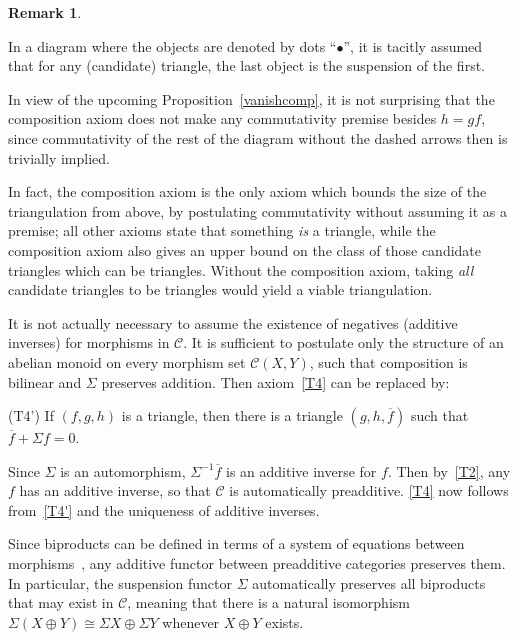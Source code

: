 \documentclass{amsproc}
\theoremstyle{definition}
\newtheorem{rem}[prop]{Remark}
\begin{document}
\begin{rem}
\label{defrems}
\begin{compactenum}
\item In a diagram where the objects are denoted by dots ``${\bullet}$'', it is tacitly assumed that for any (candidate) triangle, the last object is the suspension of the first.
\item In view of the upcoming Proposition~\ref{vanishcomp}, it is not surprising that the composition axiom does not make any commutativity premise besides $h=gf$, since commutativity of the rest of the diagram without the dashed arrows then is trivially implied.
\item In fact, the composition axiom is the only axiom which bounds the size of the triangulation from above, by postulating commutativity without assuming it as a premise; all other axioms state that something \emph{is} a triangle, while the composition axiom also gives an upper bound on the class of those candidate triangles which can be triangles. Without the composition axiom, taking \emph{all} candidate triangles to be triangles would yield a viable triangulation.
\item
\label{negativesexist}
It is not actually necessary to assume the existence of negatives (additive inverses) for morphisms in ${\mathcal{C}}$. It is sufficient to postulate only the structure of an abelian monoid on every morphism set ${\mathcal{C}}(X,Y)$, such that composition is bilinear and $\Sigma$ preserves addition. Then axiom~\ref{T4} can be replaced by:
\\
\begin{compactenum}
\item[(T4')]\label{T4'} If $(f,g,h)$ is a triangle, then there is a triangle $(g,h,\overline{f})$ such that $\overline{f}+\Sigma f=0$.
\end{compactenum}
\phantom{l\\}
Since $\Sigma$ is an automorphism, $\Sigma^{-1}\overline{f}$ is an additive inverse for $f$. Then by~\ref{T2}, any $f$ has an additive inverse, so that ${\mathcal{C}}$ is automatically preadditive. \ref{T4} now follows from~\ref{T4'} and the uniqueness of additive inverses.
\item\label{suspadd} Since biproducts can be defined in terms of a system of equations between morphisms~\cite[Sec.~VIII.2]{Mac}, any additive functor between preadditive categories preserves them. In particular, the suspension functor $\Sigma$ automatically preserves all biproducts that may exist in ${\mathcal{C}}$, meaning that there is a natural isomorphism $\Sigma(X\oplus Y)\cong \Sigma X \oplus \Sigma Y$ whenever $X\oplus Y$ exists.

\end{compactenum}
\end{rem}
\end{document}
